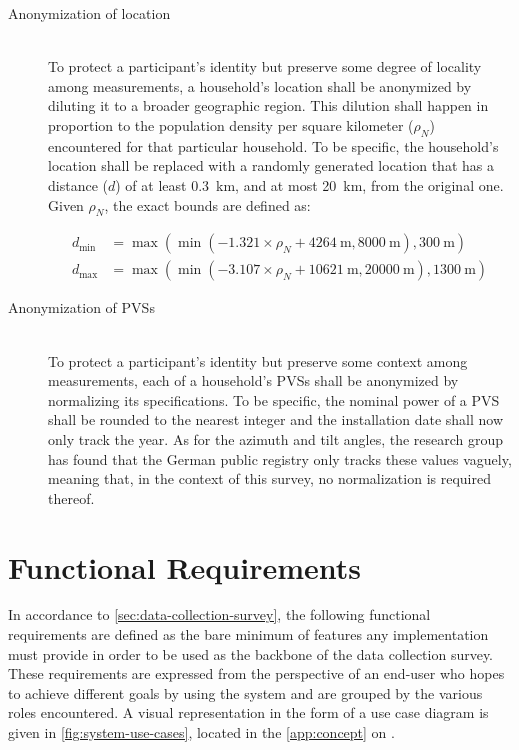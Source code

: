 \begin{description}
  \item[Anonymization of location]
  \hfill \\
  To protect a participant's identity but preserve some degree of locality among measurements, a household's location shall be anonymized by diluting it to a broader geographic region. This dilution shall happen in proportion to the population density per square  kilometer ($\rho_N$) encountered for that particular household. To be specific, the household's location shall be replaced with a randomly generated location that has a distance ($d$) of at least \SI{0.3}{\kilo\meter}, and at most \SI{20}{\kilo\meter}, from the original one. Given $\rho_N$, the exact bounds are defined as:

\begin{equation}
  \begin{aligned}
  d_{\text{min}} &= \max{(\min(-1.321 \times \rho_N + \SI{4264}{\meter}, \SI{8000}{\meter}), \SI{300}{\meter})}\\
  d_{\text{max}} &= \max{(\min(-3.107 \times \rho_N + \SI{10621}{\meter}, \SI{20000}{\meter}), \SI{1300}{\meter})}
  \end{aligned}
\label{eq:anonymize-location-min-max-distance}
\end{equation}

  \item[Anonymization of \aclp{PVS}]
  \hfill \\
  To protect a participant's identity but preserve some context among measurements, each of a household's \acsp{PVS} shall be anonymized by normalizing its specifications. To be specific, the nominal power of a \ac{PVS} shall be rounded to the nearest integer and the installation date shall now only track the year. As for the azimuth and tilt angles, the research group has found that the German public registry only tracks these values vaguely, meaning that, in the context of this survey, no normalization is required thereof.
\end{description}


\section{Functional Requirements}
\label{sec:functional-requirements}

In accordance to \autoref{sec:data-collection-survey}, the following functional requirements are defined as the bare minimum of features any implementation must provide in order to be used as the backbone of the data collection survey. These requirements are expressed from the perspective of an end-user who hopes to achieve different goals by using the system and are grouped by the various roles encountered. A visual representation in the form of a use case diagram is given in \autoref{fig:system-use-cases}, located in the \autoref{app:concept} on .

